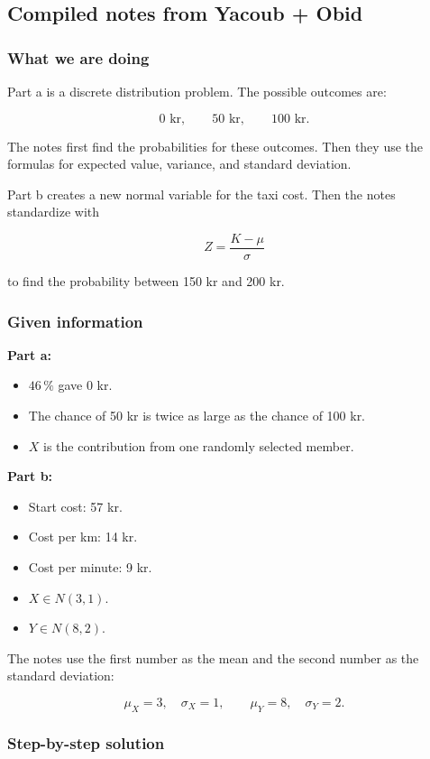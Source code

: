 \documentclass[10pt]{article}
\begin{document}
\subsection*{Compiled notes from Yacoub + Obid}

\subsubsection*{What we are doing}
Part a is a discrete distribution problem.
The possible outcomes are:

\[
0\text{ kr},\qquad 50\text{ kr},\qquad 100\text{ kr}.
\]

The notes first find the probabilities for these outcomes.
Then they use the formulas for expected value, variance,
and standard deviation.

Part b creates a new normal variable for the taxi cost.
Then the notes standardize with

\[
Z=\frac{K-\mu}{\sigma}
\]

to find the probability between 150 kr and 200 kr.

\subsubsection*{Given information}
\textbf{Part a:}

\begin{itemize}
\item $46\,\%$ gave 0 kr.
\item The chance of 50 kr is twice as large as the chance of 100 kr.
\item $X$ is the contribution from one randomly selected member.
\end{itemize}

\textbf{Part b:}

\begin{itemize}
\item Start cost: 57 kr.
\item Cost per km: 14 kr.
\item Cost per minute: 9 kr.
\item $X\in N(3,1)$.
\item $Y\in N(8,2)$.
\end{itemize}

The notes use the first number as the mean and the second number
as the standard deviation:

\[
\mu_X=3,\quad \sigma_X=1,
\qquad
\mu_Y=8,\quad \sigma_Y=2.
\]

\subsubsection*{Step-by-step solution}
\end{document}
